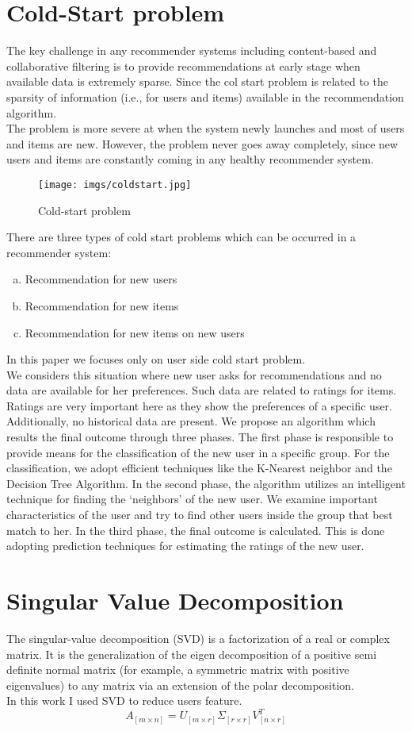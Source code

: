 \documentclass[document.tex]{subfiles}
\begin{document}
\section{Cold-Start problem}
The key challenge in any recommender systems including content-based and collaborative filtering is to provide recommendations at early stage when available data is extremely sparse. Since the col start problem is related to the sparsity of information (i.e., for users and items) available in the recommendation algorithm.\\
The problem is more severe at when the system newly launches and most of users and items are new. However, the problem never goes away completely, since new users and items are constantly coming in any healthy recommender system.
\begin{figure}[H]
	\centering
	\texttt{[image: imgs/coldstart.jpg]}
	\caption[Cold-start problem]
	{Cold-start problem}
\end{figure}
There are three types of cold start problems which can be occurred in a recommender system: 
\begin{enumerate}[a)]
	\item Recommendation for new users
	\item Recommendation for new items
	\item Recommendation for new items on new users
\end{enumerate}
In this paper we focuses only on user side cold start problem.\\
We considers this situation where new user asks for recommendations and no data are available for her preferences. Such data are related to ratings for items. Ratings are very important here as they show the preferences of a specific user. Additionally, no historical data are present. We propose an algorithm which results the final outcome through three phases. The first phase is responsible to provide means for the classification of the new user in a specific group. For the classification, we adopt efficient techniques like the K-Nearest neighbor and the Decision Tree Algorithm. In the second phase, the algorithm utilizes an intelligent technique for finding the ‘neighbors’ of the new user. We examine important characteristics of the user and try to find other users inside the group that best match to her. In the third phase, the final outcome is calculated. This is done adopting prediction techniques for estimating the ratings of the new user. 
\section{Singular Value Decomposition}
The singular-value decomposition (SVD) is a factorization of a real or complex matrix. It is the generalization of the eigen decomposition of a positive semi definite normal matrix (for example, a symmetric matrix with positive eigenvalues) to any matrix via an extension of the polar decomposition.\\
In this work I used SVD to reduce users feature.
\begin{equation}
A_{[m\times n]} = U_{[m \times r]} \Sigma_{[r \times r]} V_{[n \times r]}^T 
\label{svd}
\end{equation}
\end{document}

